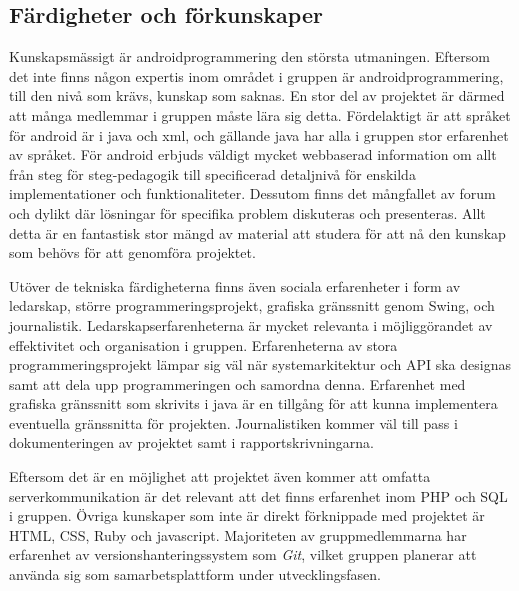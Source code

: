 \subsection{Färdigheter och förkunskaper}
\label{subsec:skillz}
Kunskapsmässigt är androidprogrammering den största utmaningen. Eftersom det inte finns någon expertis inom området i gruppen är androidprogrammering, till den nivå som krävs, kunskap som saknas. En stor del av projektet är därmed att många medlemmar i gruppen måste lära sig detta. Fördelaktigt är att språket för android är i java och xml, och gällande java har alla i gruppen stor erfarenhet av språket. För android erbjuds väldigt mycket webbaserad information om allt från steg för steg-pedagogik till specificerad detaljnivå för enskilda implementationer och funktionaliteter. Dessutom finns det mångfallet av forum och dylikt där lösningar för specifika problem diskuteras och presenteras. Allt detta är en fantastisk stor mängd av material att studera för att nå den kunskap som behövs för att genomföra projektet.

Utöver de tekniska färdigheterna finns även sociala erfarenheter i form av ledarskap, större programmeringsprojekt, grafiska gränssnitt genom Swing, och journalistik.  Ledarskapserfarenheterna är mycket relevanta i möjliggörandet av effektivitet och organisation i gruppen. Erfarenheterna av stora programmeringsprojekt lämpar sig väl när systemarkitektur och API ska designas samt att dela upp programmeringen och samordna denna. Erfarenhet med grafiska gränssnitt som skrivits i java är en tillgång för att kunna implementera eventuella gränssnitta för projekten. Journalistiken kommer väl till pass i dokumenteringen av projektet samt i rapportskrivningarna. 

Eftersom det är en möjlighet att projektet även kommer att omfatta serverkommunikation är det relevant att det finns erfarenhet inom PHP och SQL i gruppen. Övriga kunskaper som inte är direkt förknippade med projektet är HTML, CSS, Ruby och javascript. Majoriteten av gruppmedlemmarna har erfarenhet av versionshanteringssystem som \textit{Git}, vilket gruppen planerar att använda sig som samarbetsplattform under utvecklingsfasen.
